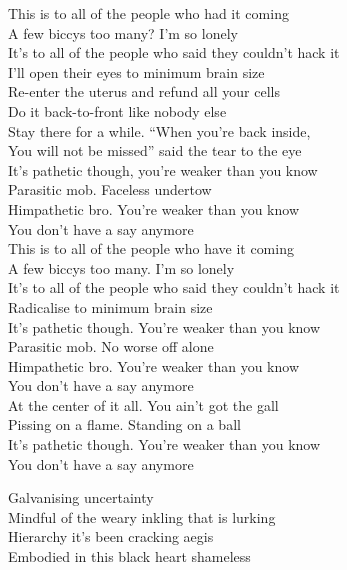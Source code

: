 This is to all of the people who had it coming \\
A few biccys too many? I'm so lonely \\
It's to all of the people who said they couldn't hack it \\
I'll open their eyes to minimum brain size \\

Re-enter the uterus and refund all your cells \\
Do it back-to-front like nobody else \\
Stay there for a while. ``When you're back inside, \\
You will not be missed'' said the tear to the eye \\

It's pathetic though, you're weaker than you know \\
Parasitic mob. Faceless undertow \\
Himpathetic bro. You're weaker than you know \\
You don't have a say anymore \\

This is to all of the people who have it coming \\
A few biccys too many. I'm so lonely \\
It's to all of the people who said they couldn't hack it \\
Radicalise to minimum brain size \\

It's pathetic though. You're weaker than you know \\
Parasitic mob. No worse off alone \\
Himpathetic bro. You're weaker than you know \\
You don't have a say anymore \\

At the center of it all. You ain't got the gall \\
Pissing on a flame. Standing on a ball \\
It's pathetic though. You're weaker than you know \\
You don't have a say anymore \\




Galvanising uncertainty \\
Mindful of the weary inkling that is lurking \\
Hierarchy it's been cracking aegis \\
Embodied in this black heart shameless \\

